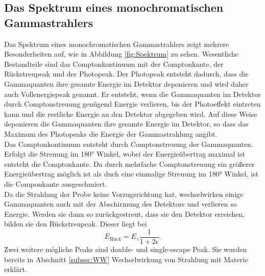 \subsection{Das Spektrum eines monochromatischen Gammastrahlers}
Das Spektrum eines monochromatischen Gammastrahlers zeigt mehrere Besonderheiten auf, wie in Abbildung \ref{fig:Spektrum} zu
sehen. Wesentliche Bestandteile sind das Comptonkontinuum mit der Comptonkante, der Rückstreupeak
und der Photopeak. Der Photopeak entsteht dadurch, dass die Gammaquanten ihre gesamte Energie im Detektor deponieren
und wird daher auch Vollenergiepeak genannt. Er entsteht, wenn die Gammaquanten im Detektor durch
Comptonstreuung genügend Energie verlieren, bis der Photoeffekt eintreten kann und die restliche Energie
an den Detektor abgegeben wird. Auf diese Weise deponieren die Gammaquanten ihre gesamte Energie im
Detektor, so dass das Maximum des Photopeaks die Energie der Gammastrahlung angibt.\\
Das Comptonkontinuum entsteht durch Comptonstreuung der Gammaquanten. Erfolgt die Streuung im
180° Winkel, wobei der Energieübertrag maximal ist entsteht die Comptonkante. Da durch mehrfache
Comptonstreuung ein größerer Energieübertrag möglich ist als duch eine einmalige Streuung im 180° Winkel, ist die
Componkante ausgeschmiert.\\
Da die Strahlung der Probe keine Vorzugsrichtung hat, wechselwirken einige Gammaquanten auch mit der
Abschirmung des Detektors und verlieren so Energie. Werden sie dann so zurückgestreut, dass sie den
Detektor erreichen, bilden sie den Rückstreupeak. Dieser liegt bei
\begin{equation}
  E_{\text{Rück}}=E_{\gamma}\frac{1}{1+2\epsilon}.
  \label{eqn:Rückstreu}
\end{equation}
Zwei weitere mögliche Peaks sind double- und single-escape Peak. Sie wurden bereits in Abschnitt \ref{subsec:WW}
Wechselwirkung von Strahlung mit Materie erklärt.


